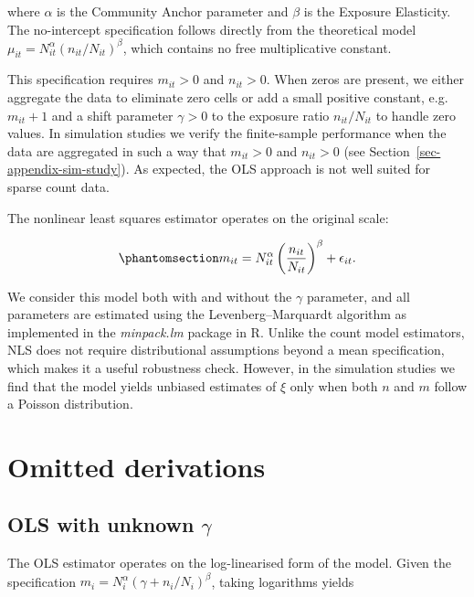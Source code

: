 where $\alpha$ is the Community Anchor parameter and $\beta$ is the
Exposure Elasticity. The no-intercept specification follows directly
from the theoretical model
$\mu_{it} = N_{it}^\alpha (n_{it}/N_{it})^\beta$, which contains no
free multiplicative constant.

This specification requires $m_{it} > 0$ and $n_{it} > 0$. When
zeros are present, we either aggregate the data to eliminate zero cells
or add a small positive constant, e.g.~$m_{it}+1$ and a shift
parameter $\gamma > 0$ to the exposure ratio $n_{it}/N_{it}$ to
handle zero values. In simulation studies we verify the finite-sample
performance when the data are aggregated in such a way that
$m_{it} > 0$ and $n_{it} > 0$ (see
Section~\ref{sec-appendix-sim-study}). As expected, the OLS approach is
not well suited for sparse count data.

The nonlinear least squares estimator operates
on the original scale:

\begin{equation}\protect\phantomsection\label{eq-nls-model}{
m_{it} = N_{it}^\alpha \left(\frac{n_{it}}{N_{it}}\right)^\beta + \epsilon_{it}.
}\end{equation}

We consider this model both with and without the $\gamma$ parameter,
and all parameters are estimated using the Levenberg--Marquardt
algorithm as implemented in the \emph{minpack.lm} package in R. Unlike
the count model estimators, NLS does not require distributional
assumptions beyond a mean specification, which makes it a useful
robustness check. However, in the simulation studies we find that the
model yields unbiased estimates of $\xi$ only when both $n$ and
$m$ follow a Poisson distribution.

\clearpage

\section{Omitted derivations}\label{sec-appendix-ommited-proofs}

\subsection{\texorpdfstring{OLS with unknown
$\gamma$}{OLS with unknown \textbackslash gamma}}\label{ols-with-unknown-gamma}

The OLS estimator operates on the log-linearised form of the model.
Given the specification $m_i = N_i^\alpha (\gamma + n_i/N_i)^\beta$,
taking logarithms yields

